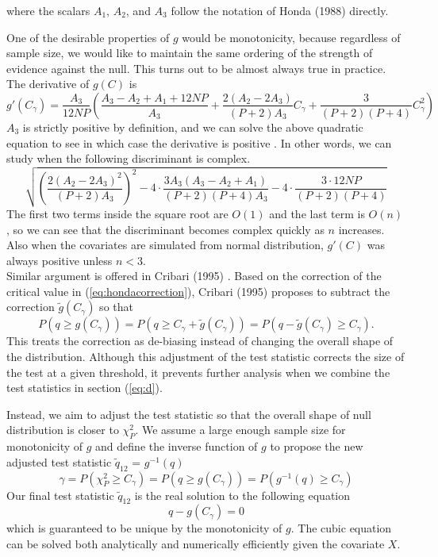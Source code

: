 \documentclass[aoas,preprint]{imsart}
\numberwithin{equation}{section}
\theoremstyle{plain}
\begin{document}
where the scalars $A_1$, $A_2$, and $A_3$ follow the notation of Honda (1988) directly. 

\vspace{5mm}  
One of the desirable properties of $g$ would be monotonicity, because regardless of sample size, we would like to maintain the same ordering of the strength of evidence against the null. This turns out to be almost always true in practice. The derivative of $g(C)$ is 
$$g'(C_{\gamma}) = \frac{A_3}{12NP}\left( \frac{A_3-A_2+A_1+12NP}{A_3} + 
 \frac{2(A_2-2A_3)}{(P+2)A_3}C_{\gamma} + \frac{3}{(P+2)(P+4)}C_{\gamma}^2 \right)$$
$A_3$ is strictly positive by definition, and we can solve the above quadratic equation to see in which case the derivative is positive \cite{cribari1995improved}. In other words, we can study when the following discriminant is complex.
$$\sqrt{\left(\frac{2(A_2-2A_3)^2}{(P+2)A_3}\right)^2 - 4\cdot\frac{3A_3(A_3-A_2+A_1)}{(P+2)(P+4)A_3} - 4\cdot
\frac{3 \cdot 12NP}{(P+2)(P+4)}}$$
The first two terms inside the square root are $O(1)$ and the last term is $O(n)$, so we can see that the discriminant becomes complex quickly as $n$ increases. Also when the covariates are simulated from normal distribution, $g'(C)$ was always positive unless $n<3$. \\


Similar argument is offered in Cribari (1995) \cite{cribari1995improved}. Based on the correction of the critical value in (\ref{eq:hondacorrection}), Cribari (1995) proposes to subtract the correction $\tilde{g}(C_{\gamma})$ so that
$$P(q  \geq g(C_{\gamma})) = P(q \geq C_{\gamma} + \tilde{g}(C_{\gamma})) = P(q - \tilde{g}(C_{\gamma}) \geq C_{\gamma}).$$
This treats the correction as de-biasing instead of changing the overall shape of the distribution. Although this adjustment of the test statistic corrects the size of the test at a given threshold, it prevents further analysis when we combine the test statistics in section (\ref{eq:d}).

\vspace{5mm} 
Instead, we aim to adjust the test statistic so that the overall shape of null distribution is closer to $\chi_{P}^2$. We assume a large enough sample size for monotonicity of $g$ and define the inverse function of $g$ to propose the new adjusted test statistic $\tilde{q}_{12}$ = $g^{-1}(q)$
$$\gamma = P(\chi_{P}^2 \geq C_{\gamma}) = P(q \geq g(C_{\gamma})) = P(g^{-1}(q) \geq C_{\gamma})$$
Our final test statistic $\tilde{q}_{12}$ is the real solution to the following equation 
$$q - g(C_{\gamma}) = 0$$
which is guaranteed to be unique by the monotonicity of $g$. The cubic equation can be solved both analytically and numerically efficiently given the covariate $X$. 

\pagebreak 



\end{document}
